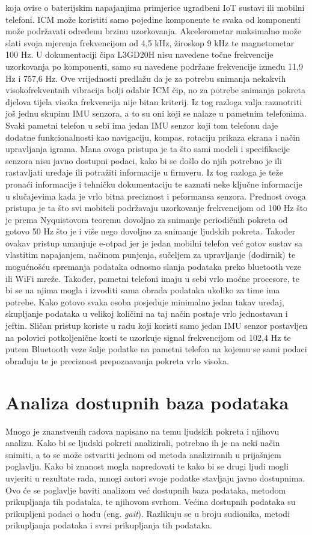 \documentclass[times, utf8, diplomski]{fer}
\begin{document}
koja ovise o baterijskim napajanjima primjerice ugradbeni IoT sustavi ili mobilni telefoni. ICM može koristiti samo pojedine
komponente te svaka od komponenti može podržavati određenu brzinu uzorkovanja. Akcelerometar maksimalno može slati svoja mjerenja
frekvencijom od 4,5 kHz, žiroskop 9 kHz te magnetometar 100 Hz. U dokumentaciji čipa L3GD20H nisu navedene točne frekvencije
uzorkovanja po komponenti, samo su navedene podržane frekvencije između 11,9 Hz i 757,6 Hz. Ove vrijednosti predlažu da je za
potrebu snimanja nekakvih visokofrekventnih vibracija bolji odabir ICM čip, no za potrebe snimanja pokreta djelova tijela visoka
frekvencija nije bitan kriterij. Iz tog razloga valja razmotriti još jednu skupinu IMU senzora, a to su oni koji se nalaze u pametnim
telefonima. Svaki pametni telefon u sebi ima jedan IMU senzor koji tom telefonu daje dodatne funkcionalnosti kao navigaciju, kompas,
rotaciju prikaza ekrana i način upravljanja igrama. Mana ovoga pristupa je ta što sami modeli i specifikacije senzora
nisu javno dostupni podaci, kako bi se došlo do njih potrebno je ili rastavljati uređaje ili potražiti informacije u firmveru.
Iz tog razloga je teže pronaći informacije i tehničku dokumentaciju te saznati neke ključne informacije u slučajevima kada je vrlo 
bitna preciznost i peformansa senzora. Prednost ovoga pristupa je ta što svi mobiteli podržavaju uzorkovanje frekvencijom od 
100 Hz što je prema Nyquistovom teoremu dovoljno za snimanje periodičnih pokreta od gotovo 50 Hz što je i više nego dovoljno za snimanje ljudskih pokreta.
Također ovakav pristup umanjuje e-otpad jer je jedan mobilni telefon već gotov sustav sa vlastitim napajanjem, načinom punjenja,
sučeljem za upravljanje (dodirnik) te mogućnošću spremanja podataka odnosno slanja podataka preko bluetooth veze ili WiFi mreže.
Također, pametni telefoni imaju u sebi vrlo moćne procesore, te bi se na njima mogla i izvoditi sama obrada podataka ukoliko za time
ima potrebe. Kako gotovo svaka osoba posjeduje minimalno jedan takav uređaj, skupljanje podataka u velikoj količini na taj način
postaje vrlo jednostavan i jeftin. Sličan pristup koriste \cite{android} u radu koji koristi samo jedan IMU senzor
postavljen na polovici potkoljenične kosti te uzorkuje signal frekvencijom od 102,4 Hz te putem Bluetooth veze šalje podatke na 
pametni telefon na kojemu se sami podaci obrađuju te je preciznost prepoznavanja pokreta vrlo visoka.

\chapter{Analiza dostupnih baza podataka}
Mnogo je znanstvenih radova napisano na temu ljudskih pokreta i njihovu analizu. Kako bi se ljudski pokreti analizirali, potrebno ih 
je na neki način snimiti, a to se može ostvariti jednom od metoda analiziranih u prijašnjem poglavlju. Kako bi znanost mogla
napredovati te kako bi se drugi ljudi mogli uvjeriti u rezultate rada, mnogi autori svoje podatke stavljaju javno dostupnima.
Ovo će se poglavlje baviti analizom već dostupnih baza podataka, metodom prikupljanja tih podataka, te njihovom svrhom.
Većina dostupnih podataka su prikupljeni podaci o hodu (eng. \textit{gait}). Razlikuju se u broju sudionika, metodi prikupljanja
podataka i svrsi prikupljanja tih podataka.
\end{document}
